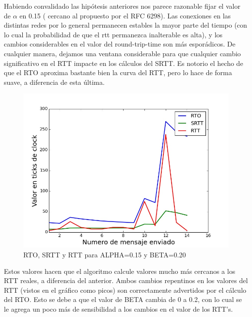 Habiendo convalidado las hipótesis anteriores nos parece razonable fijar el valor de $\alpha$ en 0.15 (
cercano al propuesto por el RFC 6298). Las conexiones en las distintas redes por lo general permanecen
estables la mayor parte del tiempo (con lo cual la probabilidad de que el rtt permanezca inalterable
es alta), y los cambios considerables en el valor del round-trip-time son más esporádicos. De cualquier
manera, dejamos una ventana considerable para que cualquier cambio significativo en el RTT impacte
en los cálculos del SRTT. Es notorio el hecho de que el RTO aproxima bastante bien la curva del RTT, pero
lo hace de forma suave, a diferencia de esta última.

\begin{figure}[H]
  \begin{center}
      \includegraphics[scale=0.32]{imagenes/ALPHA_015_BETA_020.jpg}
      \caption{RTO, SRTT y RTT para ALPHA=0.15 y BETA=0.20}
  \end{center}
\end{figure}

Estos valores hacen que el algoritmo calcule valores mucho más cercanos a los RTT reales, a diferencia
del anterior. Ambos cambios repentinos en los valores del RTT (vistos en el gráfico como picos) son
correctamente advertidos por el cálculo del RTO. Esto se debe a que el valor de BETA cambia de 0 a
0.2, con lo cual se le agrega un poco más de sensibilidad a los cambios en el valor de los RTT's.

